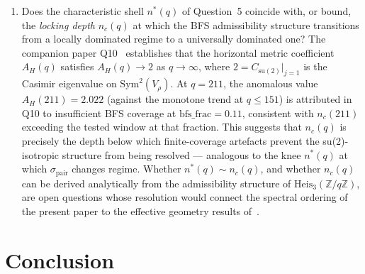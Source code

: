 \documentclass[11pt,a4paper]{article}
\begin{document}
\begin{enumerate}
    \item Does the characteristic shell $n^*(q)$ of Question~5 coincide
    with, or bound, the \emph{locking depth} $n_c(q)$ at which the BFS
    admissibility structure transitions from a locally dominated regime to
    a universally dominated one?
    The companion paper Q10~\cite{Beau2026q10} establishes that the
    horizontal metric coefficient $A_H(q)$ satisfies $A_H(q) \to 2$ as
    $q \to \infty$, where $2 = C_{\mathrm{su}(2)}|_{j=1}$ is the
    Casimir eigenvalue on $\mathrm{Sym}^2(V_\rho)$.
    At $q = 211$, the anomalous value $A_H(211) = 2.022$ (against the
    monotone trend at $q \leq 151$) is attributed in Q10 to insufficient
    BFS coverage at $\mathrm{bfs\_frac} = 0.11$, consistent with
    $n_c(211)$ exceeding the tested window at that fraction.
    This suggests that $n_c(q)$ is precisely the depth below which
    finite-coverage artefacts prevent the su(2)-isotropic structure
    from being resolved — analogous to the knee $n^*(q)$ at which
    $\sigma_{\mathrm{pair}}$ changes regime.
    Whether $n^*(q) \sim n_c(q)$, and whether $n_c(q)$ can be derived
    analytically from the admissibility structure of
    $\mathrm{Heis}_3(\mathbb{Z}/q\mathbb{Z})$, are open questions whose
    resolution would connect the spectral ordering of the present paper
    to the effective geometry results of~\cite{Beau2026q10}.

  \end{enumerate}

  \clearpage
  \section{Conclusion}
\end{document}
